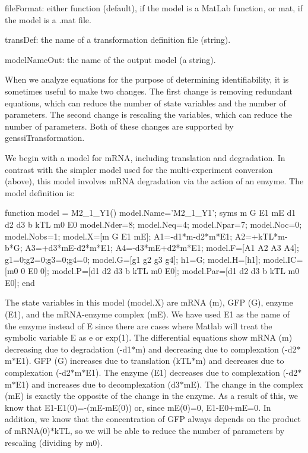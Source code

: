 file\+Format\+: either \textquotesingle{}function\textquotesingle{} (default), if the model is a Mat\+Lab function, or \textquotesingle{}mat\textquotesingle{}, if the model is a .mat file.

trans\+Def\+: the name of a transformation definition file (string).

model\+Name\+Out\+: the name of the output model (a string).

When we analyze equations for the purpose of determining identifiability, it is sometimes useful to make two changes. The first change is removing redundant equations, which can reduce the number of state variables and the number of parameters. The second change is rescaling the variables, which can reduce the number of parameters. Both of these changes are supported by genssi\+Transformation.

We begin with a model for m\+R\+NA, including translation and degradation. In contrast with the simpler model used for the multi-\/experiment conversion (above), this model involves m\+R\+NA degradation via the action of an enzyme. The model definition is\+:


\begin{DoxyCode}
\textcolor{keyword}{function} model = M2\_1\_Y1()
    model.Name='M2\_1\_Y1';
    syms m G E1 mE d1 d2 d3 b kTL m0 E0
    model.Nder=8;
    model.Neq=4;
    model.Npar=7;
    model.Noc=0;
    model.Nobs=1;
    model.X=[m G E1 mE];
    A1=-d1*m-d2*m*E1;
    A2=+kTL*m-b*G;
    A3=+d3*mE-d2*m*E1;
    A4=-d3*mE+d2*m*E1;
    model.F=[A1 A2 A3 A4];
    g1=0;g2=0;g3=0;g4=0;
    model.G=[g1 g2 g3 g4];
    h1=G;
    model.H=[h1];
    model.IC=[m0 0 E0 0];    
    model.P=[d1 d2 d3 b kTL m0 E0];
    model.Par=[d1 d2 d3 b kTL m0 E0];
end
\end{DoxyCode}


The state variables in this model (model.\+X) are m\+R\+NA (m), G\+FP (G), enzyme (E1), and the m\+R\+N\+A-\/enzyme complex (mE). We have used E1 as the name of the enzyme instead of E since there are cases where Matlab will treat the symbolic variable E as e or exp(1). The differential equations show m\+R\+NA (m) decreasing due to degradation (-\/d1$\ast$m) and decreasing due to complexation (-\/d2$\ast$m$\ast$\+E1). G\+FP (G) increases due to translation (k\+T\+L$\ast$m) and decreases due to complexation (-\/d2$\ast$m$\ast$\+E1). The enzyme (E1) decreases due to complexation (-\/d2$\ast$m$\ast$\+E1) and increases due to decomplexation (d3$\ast$mE). The change in the complex (mE) is exactly the opposite of the change in the enzyme. As a result of this, we know that E1-\/\+E1(0)=-\/(m\+E-\/mE(0)) or, since m\+E(0)=0, E1-\/\+E0+mE=0. In addition, we know that the concentration of G\+FP always depends on the product of m\+R\+N\+A(0)$\ast$k\+TL, so we will be able to reduce the number of parameters by rescaling (dividing by m0).

